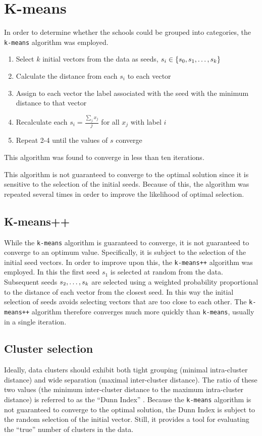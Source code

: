 \documentclass{article}
\begin{document}
	\section{K-means}
	In order to determine whether the schools could be grouped into categories, the \texttt{k-means} 
	algorithm was employed.
	
	\begin{enumerate}
		\item Select $k$ initial vectors from the data as seeds, $s_i \in \{s_0, s_1, \mathellipsis, s_k\}$
		\item Calculate the distance from each $s_i$ to each vector
		\item Assign to each vector the label associated with the seed with the minimum distance to that vector
		\item Recalculate each $s_i = \frac{\sum_j x_j}{j}$ for all $x_j$ with label $i$
		\item Repeat 2-4 until the values of $s$ converge
	\end{enumerate}
	
	This algorithm was found to converge in less than ten iterations.
	
	This algorithm is not guaranteed to converge to the optimal solution since it is sensitive to the 
	selection of the initial seeds. Because of this, the algorithm was repeated several times in order to 
	improve the likelihood of optimal selection.
	
	\subsection{K-means++}
	While the \texttt{k-means} algorithm is guaranteed to converge, it is not guaranteed to converge to an 
	optimum value. Specifically, it is subject to the selection of the initial seed vectors. In order to 
	improve upon this, the \texttt{k-means++} algorithm was employed\cite{Arthur2007}. In this the first 
	seed $s_1$ is selected at random from the data. Subsequent seeds $s_2, \mathellipsis, s_k$ are selected 
	using a weighted probability proportional to the distance of each vector from the closest seed. In this 
	way the initial selection of seeds avoids selecting vectors that are too close to each other. The 
	\texttt{k-means++} algorithm therefore converges much more quickly than \texttt{k-means}, usually in 
	a single iteration.
		
	\subsection{Cluster selection}
	Ideally, data clusters should exhibit both tight grouping (minimal intra-cluster distance) and wide 
	separation (maximal inter-cluster distance). The ratio of these two values (the minimum inter-cluster 
	distance to the maximum intra-cluster distance) is referred to as the ``Dunn Index'' \cite{dunn1974}. 
	Because the \texttt{k-means} algorithm is not guaranteed to converge to the optimal solution, the 
	Dunn Index is subject to the random selection of the initial vector. Still, it provides a tool for 
	evaluating the ``true'' number of clusters in the data.
	
\end{document}
